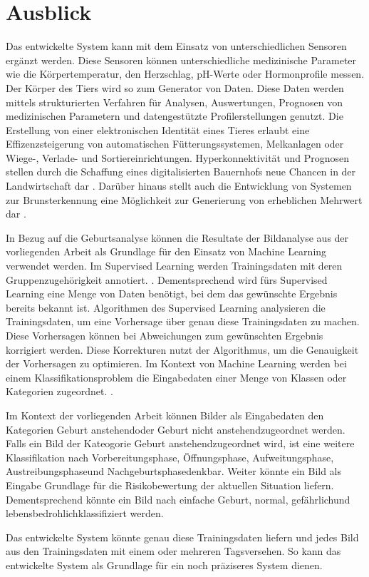 

\chapter{Ausblick}
Das entwickelte System kann mit dem Einsatz von unterschiedlichen Sensoren ergänzt werden. Diese Sensoren können unterschiedliche medizinische Parameter wie die Körpertemperatur, den Herzschlag,  pH-Werte oder Hormonprofile messen. Der Körper des Tiers wird so zum Generator von Daten. Diese Daten werden mittels strukturierten Verfahren für Analysen, Auswertungen, Prognosen von medizinischen Parametern und datengestützte Profilerstellungen genutzt. Die Erstellung von einer elektronischen Identität eines Tieres erlaubt eine Effizenzsteigerung von automatischen Fütterungssystemen, Melkanlagen oder Wiege-, Verlade- und Sortiereinrichtungen. Hyperkonnektivität und Prognosen stellen durch die Schaffung eines digitalisierten Bauernhofs neue Chancen in der Landwirtschaft dar \citep[S. 308 ff.]{Kasprowicz2019}. Darüber hinaus stellt auch die Entwicklung von Systemen zur Brunsterkennung eine Möglichkeit zur Generierung von erheblichen Mehrwert dar \cite{Hirsbrunner2020}.


In Bezug auf die Geburtsanalyse können die Resultate der Bildanalyse aus der vorliegenden Arbeit als Grundlage für den Einsatz von Machine Learning verwendet werden.
Im Supervised Learning werden Trainingsdaten mit deren Gruppenzugehörigkeit annotiert. \citep[S. 253]{Firouzi2020}. 
Dementsprechend wird fürs Supervised Learning eine Menge von Daten benötigt, bei dem das gewünschte Ergebnis bereits bekannt ist. Algorithmen des Supervised Learning analysieren die Trainingsdaten, um eine Vorhersage über genau diese Trainingsdaten zu machen. Diese Vorhersagen können bei Abweichungen zum gewünschten Ergebnis korrigiert werden. Diese Korrekturen nutzt der Algorithmus, um die Genauigkeit der Vorhersagen zu optimieren. Im Kontext von Machine Learning werden bei einem Klassifikationsproblem die Eingabedaten einer Menge von Klassen oder Kategorien zugeordnet. \citep[S. 440]{FernandezVillan2019}.

Im Kontext der vorliegenden Arbeit können Bilder als Eingabedaten den Kategorien \flqq Geburt anstehend\frqq oder \flqq Geburt nicht anstehend\frqq zugeordnet werden. Falls ein Bild der Kateogorie \flqq Geburt anstehend\frqq zugeordnet wird, ist eine weitere Klassifikation nach \flqq Vorbereitungsphase\frqq, \flqq Öffnungsphase\frqq, \flqq Aufweitungsphase\frqq, \flqq Austreibungsphase\frqq und \flqq Nachgeburtsphase\frqq denkbar. Weiter könnte ein Bild als Eingabe Grundlage für die Risikobewertung der aktuellen Situation liefern. Dementsprechend könnte ein Bild nach \flqq einfache Geburt\frqq, \flqq normal\frqq, \flqq gefährlich\frqq und \flqq lebensbedrohlich\frqq klassifiziert werden. 

Das entwickelte System könnte genau diese Trainingsdaten liefern und jedes Bild aus den Trainingsdaten mit einem oder mehreren \flqq Tags\frqq versehen. So kann das entwickelte System als Grundlage für ein noch präziseres System dienen.